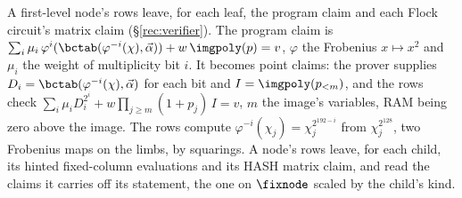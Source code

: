 A first-level node's rows leave, for each leaf, the program claim and each Flock circuit's matrix claim (\S\ref{rec:verifier}). The program claim is $\sum_i\mu_i\,\varphi^i(\bctab(\varphi^{-i}(\chi),\vec\alpha))+w\,\imgpoly(p)=v$, $\varphi$ the Frobenius $x\mapsto x^2$ and $\mu_i$ the weight of multiplicity bit $i$. It becomes point claims: the prover supplies $D_i=\bctab(\varphi^{-i}(\chi),\vec\alpha)$ for each bit and $I=\imgpoly(p_{<m})$, and the rows check $\sum_i\mu_iD_i^{2^i}+w\prod_{j\ge m}(1+p_j)\,I=v$, $m$ the image's variables, RAM being zero above the image. The rows compute $\varphi^{-i}(\chi_j)=\chi_j^{2^{192-i}}$ from $\chi_j^{2^{128}}$, two Frobenius maps on the limbs, by squarings. A node's rows leave, for each child, its hinted fixed-column evaluations and its \textsf{HASH} matrix claim, and read the claims it carries off its statement, the one on $\fixnode$ scaled by the child's kind.

